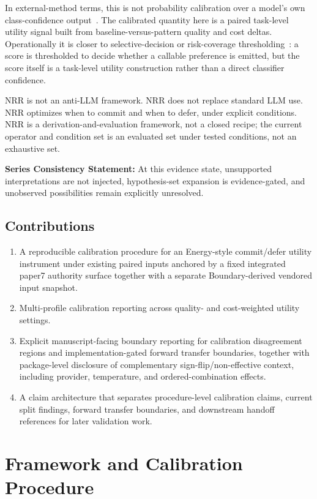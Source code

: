 \documentclass[11pt,a4paper]{article}
\begin{document}
In external-method terms, this is not probability calibration over a model's own
class-confidence output~\cite{guo2017calibration}. The calibrated quantity here
is a paired task-level utility signal built from baseline-versus-pattern quality
and cost deltas. Operationally it is closer to selective-decision or
risk-coverage thresholding~\cite{geifman2017selective}: a score is thresholded
to decide whether a callable preference is emitted, but the score itself is a
task-level utility construction rather than a direct classifier confidence.

NRR is not an anti-LLM framework.
NRR does not replace standard LLM use.
NRR optimizes when to commit and when to defer, under explicit conditions.
NRR is a derivation-and-evaluation framework, not a closed recipe; the current operator and condition set is an evaluated set under tested conditions, not an exhaustive set.

\textbf{Series Consistency Statement:}
At this evidence state, unsupported interpretations are not injected, hypothesis-set expansion is evidence-gated, and unobserved possibilities remain explicitly unresolved.

\subsection{Contributions}

\begin{enumerate}
  \item A reproducible calibration procedure for an Energy-style commit/defer utility instrument under existing paired inputs anchored by a fixed integrated paper7 authority surface together with a separate Boundary-derived vendored input snapshot.
  \item Multi-profile calibration reporting across quality- and cost-weighted utility settings.
  \item Explicit manuscript-facing boundary reporting for calibration disagreement regions and implementation-gated forward transfer boundaries, together with package-level disclosure of complementary sign-flip/non-effective context, including provider, temperature, and ordered-combination effects.
  \item A claim architecture that separates procedure-level calibration claims, current split findings, forward transfer boundaries, and downstream handoff references for later validation work.
\end{enumerate}

\section{Framework and Calibration Procedure}
\label{sec:framework}
\end{document}
